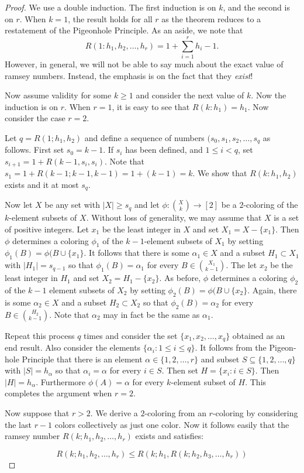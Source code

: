\begin{proof}
We use a double induction.  The first induction is on $k$,
and the second is on $r$.  When $k=1$, the result holds for
all $r$ as the theorem reduces to a restatement of the Pigeonhole
Principle.  As an aside, we note that
\[
R(1:h_1,h_2,\dots,h_r)= 1+\sum_{i=1}^r h_i-1.
\]
However, in general, we will not be able to say much about
the exact value of ramsey numbers.  Instead, the emphasis is
on the fact that they \textit{exist}!

Now assume validity for some $k\ge1$ and consider the next value
of $k$. Now the induction is on $r$.  When $r=1$, it is easy
to see that $R(k:h_1)=h_1$.  Now consider the case $r=2$.

Let $q=R(1;h_1,h_2)$ and define a sequence of numbers 
$(s_0,s_1,s_2,\dots,s_{q}$ as follows.  First set $s_0=k-1$.  
If $s_i$ has been defined, and $1\le i<q$, set $s_{i+1}=1+R(k-1,s_i,s_i)$.  
Note that $s_1=1+R(k-1;k-1,k-1) = 1 + (k-1)=k$.
We show that $R(k:h_1,h_2)$ exists and it at most $s_q$.  

Now let $X$ be any set with $|X|\ge s_q$ and let $\phi:
\binom{X}{k}\longrightarrow [2]$ be a $2$-coloring of the
$k$-element subsets of $X$. Without loss of generality, we
may assume that $X$ is a set of positive integers.
Let $x_1$ be the least integer in $X$ and set $X_1=X-\{x_1\}$.
Then $\phi$ determines a coloring $\phi_1$ of the $k-1$-element subsets of 
$X_1$ by setting $\phi_1(B)=\phi(B\cup\{x_1\}$.
It follows that there is some $\alpha_1\in X$ and a subset
$H_1\subset X_1$ with $|H_1|=s_{q-1}$ so that $\phi_1(B)=\alpha_1$ for
every $B\in\binom{X_1}{k-1}$.  The let $x_2$ be the least integer
in $H_1$ and set $X_2=H_1-\{x_2\}$.  As before, $\phi$ determines
a coloring $\phi_2$ of the $k-1$ element subsets of $X_2$ by
setting $\phi_2(B)=\phi(B\cup\{x_2\}$.  Again, there is some
$\alpha_2\in X$ and a subset $H_2\subset X_2$ so
that $\phi_2(B)=\alpha_2$ for every $B\in\binom{H_2}{k-1}$. Note
that $\alpha_2$ may in fact be the same as $\alpha_1$.

Repeat this process $q$ times and consider the 
set $\{x_1,x_2,\dots,x_q\}$ obtained as an end result.
Also consider the elements $\{\alpha_i:1\le i\le q\}$.  
It follows from the Pigeon-hole Principle that there
is an element $\alpha\in\{1,2,\dots,r\}$ and subset  
$S\subseteq \{1,2,\dots,q\}$ with $|S|=h_\alpha$ so
that $\alpha_i=\alpha$ for every $i\in S$.  Then
set $H=\{x_i:i\in S\}$.  Then $|H|=h_\alpha$.  Furthermore
$\phi(A)=\alpha$ for every $k$-element subset of $H$.
This completes the argument when $r=2$.

Now suppose that $r>2$.  We derive a $2$-coloring from an
$r$-coloring by considering the last $r-1$ colors collectively
as just one color.  Now  it follows easily that
the ramsey number $R(k;h_1,h_2,\dots,h_r)$ exists and
satisfies:

\[
R(k;h_1,h_2,\dots,h_r)\le R(k;h_1,R(k;h_2,h_3,\dots,h_r))
\]
\end{proof}

